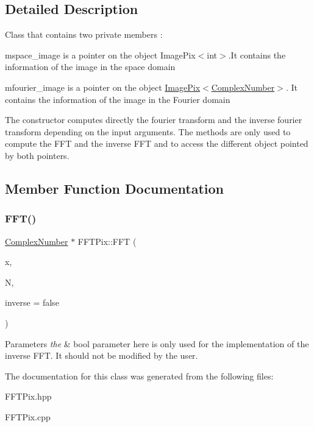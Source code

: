 \subsection{Detailed Description}
Class that contains two private members \+:
\begin{DoxyItemize}
\item mspace\+\_\+image is a pointer on the object Image\+Pix$<$int$>$.\+It contains the information of the image in the space domain
\item mfourier\+\_\+image is a pointer on the object \hyperlink{class_image_pix}{Image\+Pix$<$\+Complex\+Number$>$}. It contains the information of the image in the Fourier domain
\end{DoxyItemize}

The constructor computes directly the fourier transform and the inverse fourier transform depending on the input arguments. The methods are only used to compute the F\+FT and the inverse F\+FT and to access the different object pointed by both pointers. 

\subsection{Member Function Documentation}
\mbox{\label{class_f_f_t_pix_aa0b0b6a2bff47b800d3e61770a187ba6}} 
\subsubsection{\texorpdfstring{F\+F\+T()}{FFT()}}
{\footnotesize\ttfamily \hyperlink{class_complex_number}{Complex\+Number} $\ast$ F\+F\+T\+Pix\+::\+F\+FT (\begin{DoxyParamCaption}\item[{\hyperlink{class_complex_number}{Complex\+Number} $\ast$}]{x,  }\item[{int}]{N,  }\item[{bool}]{inverse = {\ttfamily false} }\end{DoxyParamCaption})}


\begin{DoxyParams}{Parameters}
{\em the} & bool parameter here is only used for the implementation of the inverse F\+FT. It should not be modified by the user. \\
\hline
\end{DoxyParams}


The documentation for this class was generated from the following files\+:\begin{DoxyCompactItemize}
\item 
F\+F\+T\+Pix.\+hpp\item 
F\+F\+T\+Pix.\+cpp\end{DoxyCompactItemize}
